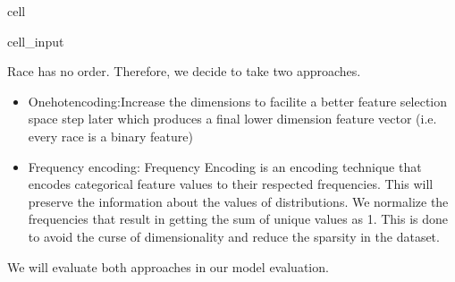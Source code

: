 \documentclass[letterpaper,10pt,english]{jupyterBook}
\begin{document}
\begin{sphinxuseclass}{cell}\begin{sphinxVerbatimInput}

\begin{sphinxuseclass}{cell_input}
\begin{sphinxVerbatim}[commandchars=\\\{\}]
\PYG{p}{[}\PYG{p}{]}
     
\end{sphinxVerbatim}

\end{sphinxuseclass}\end{sphinxVerbatimInput}

\end{sphinxuseclass}
\sphinxAtStartPar
Race has no order. Therefore, we decide to take two approaches.
\begin{itemize}
\item {} 
\sphinxAtStartPar
One\sphinxhyphen{}hot\sphinxhyphen{}encoding:Increase the dimensions to facilite a better feature selection space step later which produces a final lower dimension feature vector (i.e. every race is a binary feature)

\item {} 
\sphinxAtStartPar
Frequency encoding:  Frequency Encoding is an encoding technique that encodes categorical feature values to their respected frequencies. This will preserve the information about the values of distributions. We normalize the frequencies that result in getting the sum of unique values as 1. This is done to avoid the curse of dimensionality and reduce the sparsity in the dataset.

\end{itemize}

\sphinxAtStartPar
We will evaluate both approaches in our model evaluation.
\end{document}
